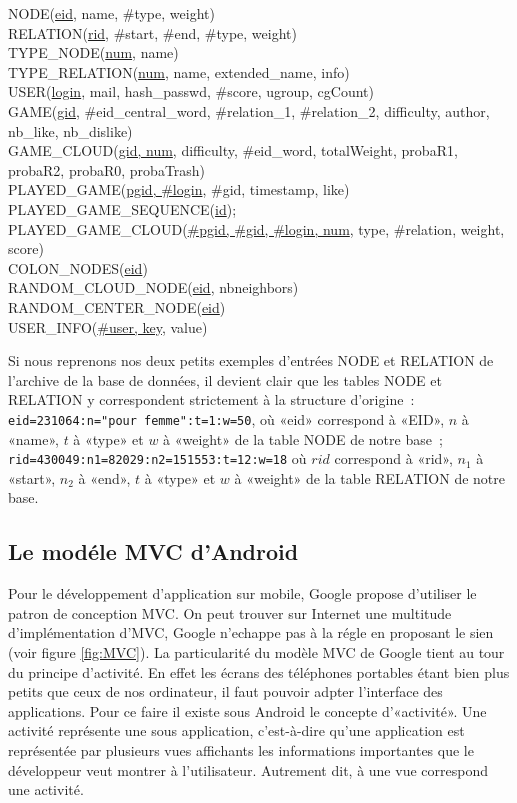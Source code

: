 \documentclass[a4paper,11pt,french]{article}
\def\android{Android\texttrademark{}}
\begin{document}
{\footnotesize
NODE(\underline{eid}, name, \#type, weight) \\ 
RELATION(\underline{rid}, \#start, \#end, \#type, weight) \\
TYPE\_NODE(\underline{num}, name) \\
TYPE\_RELATION(\underline{num}, name, extended\_name, info) \\
USER(\underline{login}, mail, hash\_passwd, \#score, ugroup, cgCount) \\
GAME(\underline{gid}, \#eid\_central\_word, \#relation\_1, \#relation\_2, difficulty, author, nb\_like, nb\_dislike) \\
GAME\_CLOUD(\underline{gid, num}, difficulty, \#eid\_word, totalWeight, probaR1, probaR2, probaR0, probaTrash) \\
PLAYED\_GAME(\underline{pgid, \#login}, \#gid, timestamp, like) \\
PLAYED\_GAME\_SEQUENCE(\underline{id}); \\
PLAYED\_GAME\_CLOUD(\underline{\#pgid, \#gid, \#login, num}, type, \#relation, weight, score)  \\
COLON\_NODES(\underline{eid}) \\
RANDOM\_CLOUD\_NODE(\underline{eid}, nbneighbors) \\
RANDOM\_CENTER\_NODE(\underline{eid}) \\
USER\_INFO(\underline{\#user, key}, value) \\
}

Si nous reprenons nos deux petits exemples d'entrées NODE et RELATION de l'archive de la base de données, il devient clair que les tables NODE et
RELATION y correspondent strictement à la structure d'origine~: \verb!eid=231064:n="pour femme":t=1:w=50!, où «eid» correspond à «EID», $n$ à
«name», $t$ à «type» et $w$ à «weight» de la table NODE de notre base~; \verb!rid=430049:n1=82029:n2=151553:t=12:w=18! où $rid$ correspond à «rid»,
$n_1$ à «start», $n_2$ à «end», $t$ à «type» et $w$ à «weight» de la table RELATION de notre base.


\subsection{Le modéle MVC d'\android{}}
Pour le développement d'application sur mobile, Google propose d'utiliser le patron de conception MVC. On peut trouver sur Internet une multitude d'implémentation d'MVC, Google n'echappe pas à la régle en proposant
le sien (voir figure \ref{fig:MVC}).
La particularité du modèle MVC de Google tient au tour du principe d'activité. En effet les écrans des téléphones portables étant bien plus petits que ceux de nos ordinateur, il faut pouvoir adpter l'interface des applications. Pour ce faire il existe
sous \android{} le concepte d'«activité».
Une activité représente une sous application, c'est-à-dire qu'une application est représentée par plusieurs vues affichants les informations importantes que le développeur veut montrer à l'utilisateur. Autrement dit, à une vue
correspond une activité.
\end{document}
